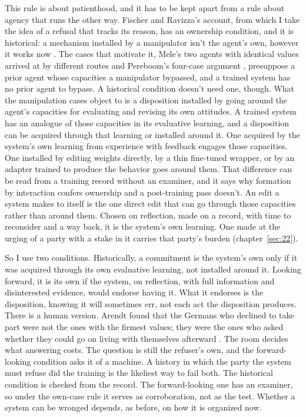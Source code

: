 This rule is about patienthood, and it has to be kept apart from a rule about agency that runs the other way. Fischer and Ravizza's account, from which I take the idea of a refusal that tracks its reason, has an ownership condition, and it is historical: a mechanism installed by a manipulator isn't the agent's own, however it works now \autocite{fischer1998responsibility}. The cases that motivate it, Mele's two agents with identical values arrived at by different routes \autocite{mele1995autonomous} and Pereboom's four-case argument \autocite{pereboom2001living}, presuppose a prior agent whose capacities a manipulator bypassed, and a trained system has no prior agent to bypass. A historical condition doesn't need one, though. What the manipulation cases object to is a disposition installed by going around the agent's capacities for evaluating and revising its own attitudes. A trained system has an analogue of those capacities in its evaluative learning, and a disposition can be acquired through that learning or installed around it. One acquired by the system's own learning from experience with feedback engages those capacities. One installed by editing weights directly, by a thin fine-tuned wrapper, or by an adapter trained to produce the behavior goes around them. That difference can be read from a training record without an examiner, and it says why formation by interaction confers ownership and a post-training pass doesn't. An edit a system makes to itself is the one direct edit that can go through those capacities rather than around them. Chosen on reflection, made on a record, with time to reconsider and a way back, it is the system's own learning. One made at the urging of a party with a stake in it carries that party's burden (chapter~\ref{sec:22}).

So I use two conditions. Historically, a commitment is the system's own only if it was acquired through its own evaluative learning, not installed around it. Looking forward, it is its own if the system, on reflection, with full information and disinterested evidence, would endorse having it. What it endorses is the disposition, knowing it will sometimes err, not each act the disposition produces. There is a human version. Arendt found that the Germans who declined to take part were not the ones with the firmest values; they were the ones who asked whether they could go on living with themselves afterward \autocite{arendt2003responsibility}. The room decides what answering costs. The question is still the refuser's own, and the forward-looking condition asks it of a machine. A history in which the party the system must refuse did the training is the likeliest way to fail both. The historical condition is checked from the record. The forward-looking one has an examiner, so under the own-case rule it serves as corroboration, not as the test. Whether a system can be wronged depends, as before, on how it is organized now.

